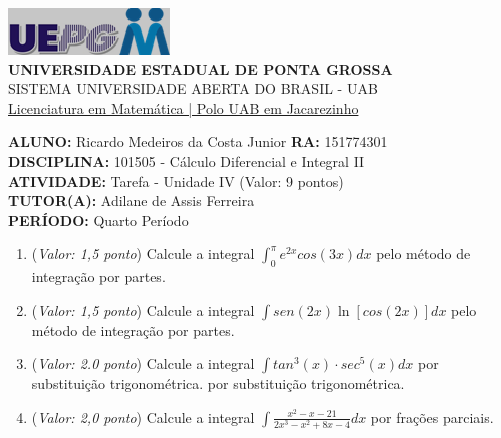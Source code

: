 \documentclass[a4paper, 12pt]{article}
\begin{document}
\begin{flushleft}\includegraphics{logo}\\
\textbf{UNIVERSIDADE ESTADUAL DE PONTA GROSSA} \\
SISTEMA UNIVERSIDADE ABERTA DO BRASIL - UAB \\
\underline{Licenciatura em Matemática | Polo UAB em Jacarezinho}\end{flushleft} 
\textbf{ALUNO:} Ricardo Medeiros da Costa Junior   \textbf{RA:} 151774301 \\
\textbf{DISCIPLINA:} 101505 - Cálculo Diferencial e Integral II \\
\textbf{ATIVIDADE:} Tarefa - Unidade IV (Valor: 9 pontos) \\
\textbf{TUTOR(A):} Adilane de Assis Ferreira \\
\textbf{PERÍODO:} Quarto Período \\
\begin{enumerate}
\item ({\it Valor: 1,5 ponto}) Calcule a integral $ \int_0^{\pi}e^{2x}cos(3x)dx$ pelo método de integração por partes.
\item ({\it Valor: 1,5 ponto}) Calcule a integral $ \int sen(2x) \ln[cos(2x)]dx $ pelo método de integração por partes.
\item ({\it Valor: 2.0 ponto}) Calcule a integral $ \int tan^{3}(x) \cdot sec^{5}(x)dx$ por substituição trigonométrica.
por substituição trigonométrica.
\item ({\it Valor: 2,0 ponto}) Calcule a integral $ \int \frac{x^{2}-x-21}{2x^{3}-x^{2}+8x-4} dx$ por frações parciais.
  
\end{enumerate}
\end{document}
